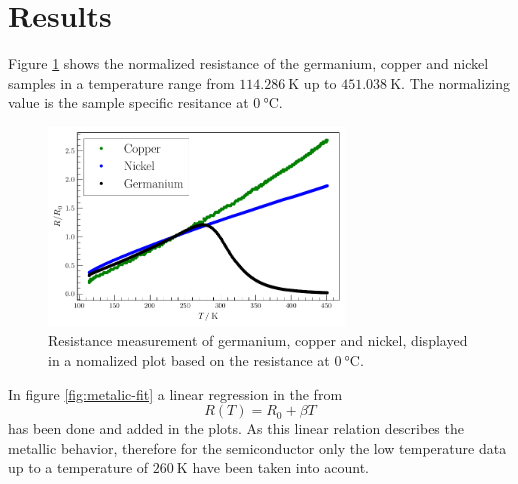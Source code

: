 
\section{Results}
\label{sec:Results}

Figure \ref{fig:comparison} shows the normalized resistance of the germanium, copper and nickel samples in a temperature range from $\SI{114.286}{\kelvin}$ up to $\SI{451.038}{\kelvin}$.
The normalizing value is the sample specific resitance at $\SI{0}{\celsius}$.

\begin{figure}
    \centering
    \captionsetup{width=0.9\linewidth}
    \includegraphics[width=0.7\textwidth]{plots/compare.pdf}
  \caption{Resistance measurement of germanium, copper and nickel, displayed in a nomalized plot based on the resistance at $\SI{0}{\celsius}$.}
    \label{fig:comparison}
\end{figure}

In figure \ref{fig:metalic-fit} a linear regression in the from
\begin{equation}
    R(T) = R_0 +\beta T
\end{equation}\label{equ:metalic-fit}
has been done and added in the plots. 
As this linear relation describes the metallic behavior, therefore for the semiconductor only the low temperature data up to a temperature of $\SI{260}{\kelvin}$ have been taken into acount.

